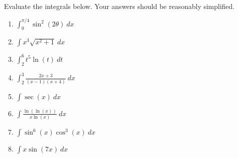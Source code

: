 \documentclass[11pt,fleqn]{article}
\begin{document}
\renewcommand{\headrulewidth}{0pt}
\newcommand{\blank}[1]{\rule{#1}{0.75pt}}
\newcommand{\bc}{\begin{center}}
\newcommand{\ec}{\end{center}}
\renewcommand{\d}{\displaystyle}

\vspace*{-0.7in}

\begin{center}
  \large
  \\
   
\end{center}
 Evaluate the integrals below. Your answers should be reasonably simplified. 
\begin{enumerate}
\item $\displaystyle{\int_0^{\pi/4} \sin^2(2\theta)\: dx}$
\vfill
\item $\displaystyle{\int x^3 \sqrt{x^2+1} \: dx}$
\vfill
\item $\displaystyle{\int_2^6 t^5 \ln (t)  \: dt}$
\vfill
\item $\displaystyle{\int_2^3 \frac{2x+3}{(x-1)(x+4)}  \: dx}$
\vfill
\newpage
\item $\displaystyle{\int \sec(x) \: dx}$
\vfill
\item $\displaystyle{\int  \frac{\ln(\ln(x))}{x \ln(x)}\: dx}$
\vfill
\item $\displaystyle{\int  \sin^6(x) \cos^3(x)\: dx}$
\vfill
\item $\displaystyle{\int  x\sin(7x) \: dx}$
\vfill
\end{enumerate}
\end{document}
